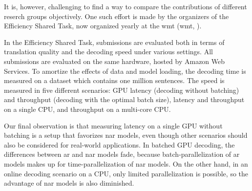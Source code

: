 It is, however, challenging to find a way to compare the contributions of
different reserch groups objectively. One such effort is made by the organizers
of the Efficiency Shared Task, now organized yearly at the \acl{wmt}
(\acs{wmt}, \citealp{heafield-etal-2020-findings,
  heafield-etal-2021-findings}).

In the Efficiency Shared Task, submissions are evaluated both in terms of
translation quality and the decoding speed under various settings. All
submissions are evaluated on the same hardware, hosted by Amazon Web Services.
To amortize the effects of data and model loading, the decoding time is
measured on a dataset which contains one million sentences. The speed is
measured in five different scenarios: GPU latency (decoding without batching)
and throughput (decoding with the optimal batch size), latency and throughput
on a single CPU, and throughput on a multi-core CPU. 



Our final observation is that measuring latency on a single GPU without
batching is a setup that favorizes \ac{nar} models, even though other scenarios
should also be considered for real-world applications. In batched GPU decoding,
the differences between \ac{ar} and \ac{nar} models fade, because
batch-parallelization of \ac{ar} models makes up for time-parallelization of
\ac{nar} models. On the other hand, in an online decoding scenario on a CPU,
only limited parallelization is possible, so the advantage of \ac{nar} models
is also diminished. 








